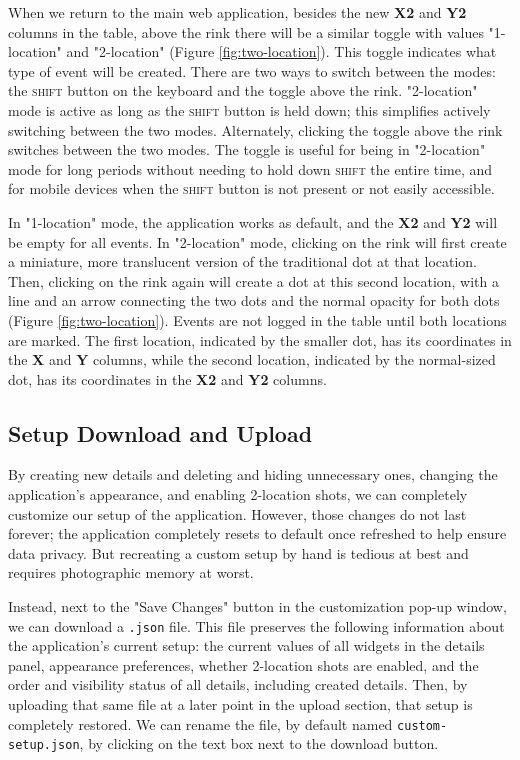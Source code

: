 \documentclass[letterpaper]{article}
\begin{document}
When we return to the main web application, besides the new \textbf{X2} and \textbf{Y2} columns in the table, above the rink there will be a similar toggle with values "1-location" and "2-location" (Figure \ref{fig:two-location}). This toggle indicates what type of event will be created. There are two ways to switch between the modes: the \textsc{shift} button on the keyboard and the toggle above the rink. "2-location" mode is active as long as the \textsc{shift} button is held down; this simplifies actively switching between the two modes. Alternately, clicking the toggle above the rink switches between the two modes. The toggle is useful for being in "2-location" mode for long periods without needing to hold down \textsc{shift} the entire time, and for mobile devices when the \textsc{shift} button is not present or not easily accessible.

In "1-location" mode, the application works as default, and the \textbf{X2} and \textbf{Y2} will be empty for all events. In "2-location" mode, clicking on the rink will first create a miniature, more translucent version of the traditional dot at that location. Then, clicking on the rink again will create a dot at this second location, with a line and an arrow connecting the two dots and the normal opacity for both dots (Figure \ref{fig:two-location}). Events are not logged in the table until both locations are marked. The first location, indicated by the smaller dot, has its coordinates in the  \textbf{X} and \textbf{Y} columns, while the second location, indicated by the normal-sized dot, has its coordinates in the \textbf{X2} and \textbf{Y2} columns.
 
\subsection{Setup Download and Upload} \label{setup-download-upload}
By creating new details and deleting and hiding unnecessary ones, changing the application's appearance, and enabling 2-location shots, we can completely customize our setup of the application. However, those changes do not last forever; the application completely resets to default once refreshed to help ensure data privacy. But recreating a custom setup by hand is tedious at best and requires photographic memory at worst. 

Instead, next to the "Save Changes" button in the customization pop-up window, we can download a \texttt{.json} file. This file preserves the following information about the application's current setup: the current values of all widgets in the details panel, appearance preferences, whether 2-location shots are enabled, and the order and visibility status of all details, including created details. Then, by uploading that same file at a later point in the upload section, that setup is completely restored. We can rename the file, by default named \texttt{custom-setup.json}, by clicking on the text box next to the download button.
\end{document}
